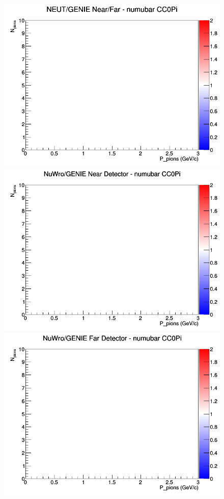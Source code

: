 \documentclass[12pt]{article}
\begin{document}
\begin{figure}[h]
\endminipage
{}
\includegraphics[width=\linewidth]{N_P/nominal/pions/ratios/CC0Pi_NEUT_GENIE_numubar_NF_N_P.png}
\endminipage
\newline
{}
\includegraphics[width=\linewidth]{N_P/nominal/pions/ratios/CC0Pi_NuWro_GENIE_numubar_near_N_P.png}
\endminipage
{}
\includegraphics[width=\linewidth]{N_P/nominal/pions/ratios/CC0Pi_NuWro_GENIE_numubar_far_N_P.png}

\end{figure}
\end{document}
